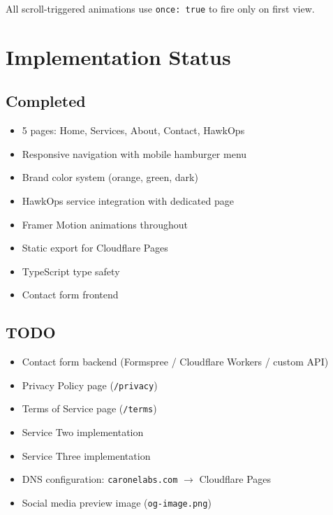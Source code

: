 \documentclass[11pt,a4paper]{article}
\begin{document}
\vspace{0.5cm}
All scroll-triggered animations use \texttt{once: true} to fire only on first view.

\newpage

\section{Implementation Status}

\subsection{Completed}

\begin{itemize}[leftmargin=1.5cm]
  \item[\textcolor{carone-green}{\checkmark}] 5 pages: Home, Services, About, Contact, HawkOps
  \item[\textcolor{carone-green}{\checkmark}] Responsive navigation with mobile hamburger menu
  \item[\textcolor{carone-green}{\checkmark}] Brand color system (orange, green, dark)
  \item[\textcolor{carone-green}{\checkmark}] HawkOps service integration with dedicated page
  \item[\textcolor{carone-green}{\checkmark}] Framer Motion animations throughout
  \item[\textcolor{carone-green}{\checkmark}] Static export for Cloudflare Pages
  \item[\textcolor{carone-green}{\checkmark}] TypeScript type safety
  \item[\textcolor{carone-green}{\checkmark}] Contact form frontend
\end{itemize}

\subsection{TODO}

\begin{itemize}[leftmargin=1.5cm]
  \item[\textcolor{carone-orange}{$\circ$}] Contact form backend (Formspree / Cloudflare Workers / custom API)
  \item[\textcolor{carone-orange}{$\circ$}] Privacy Policy page (\texttt{/privacy})
  \item[\textcolor{carone-orange}{$\circ$}] Terms of Service page (\texttt{/terms})
  \item[\textcolor{carone-orange}{$\circ$}] Service Two implementation
  \item[\textcolor{carone-orange}{$\circ$}] Service Three implementation
  \item[\textcolor{carone-orange}{$\circ$}] DNS configuration: \texttt{caronelabs.com} $\to$ Cloudflare Pages
  \item[\textcolor{carone-orange}{$\circ$}] Social media preview image (\texttt{og-image.png})
\end{itemize}
\end{document}
